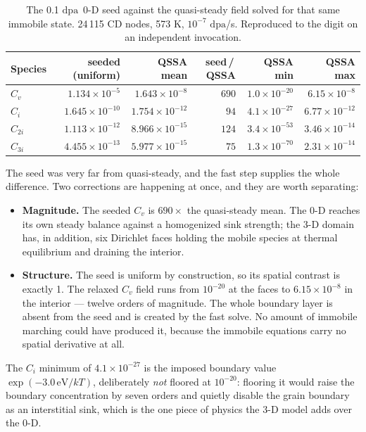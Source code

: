 \documentclass[11pt,a4paper]{article}
\newcommand{\dpa}{\ensuremath{\mathrm{dpa}}}
\begin{document}
\begin{table}[htb]
\centering
\caption{The 0.1 \dpa\ 0-D seed against the quasi-steady field solved for that
         same immobile state. 24\,115 CD nodes, 573 K, $10^{-7}$ \dpa/s.
         Reproduced to the digit on an independent invocation.}
\label{tab:seedrelax}
\begin{tabular}{lrrrrr}
\toprule
Species & seeded (uniform) & QSSA mean & seed\,/\,QSSA & QSSA min & QSSA max \\
\midrule
$C_v$   & $1.134\times10^{-5}$  & $1.643\times10^{-8}$  & $690$ & $1.0\times10^{-20}$ & $6.15\times10^{-8}$ \\
$C_i$   & $1.645\times10^{-10}$ & $1.754\times10^{-12}$ & $94$  & $4.1\times10^{-27}$ & $6.77\times10^{-12}$ \\
$C_{2i}$& $1.113\times10^{-12}$ & $8.966\times10^{-15}$ & $124$ & $3.4\times10^{-53}$ & $3.46\times10^{-14}$ \\
$C_{3i}$& $4.455\times10^{-13}$ & $5.977\times10^{-15}$ & $75$  & $1.3\times10^{-70}$ & $2.31\times10^{-14}$ \\
\bottomrule
\end{tabular}
\end{table}

The seed was very far from quasi-steady, and the fast step supplies the whole
difference. Two corrections are happening at once, and they are worth
separating:

\begin{itemize}
\item \textbf{Magnitude.} The seeded $C_v$ is $690\times$ the quasi-steady mean.
      The 0-D reaches its own steady balance against a homogenized sink
      strength; the 3-D domain has, in addition, six Dirichlet faces holding the
      mobile species at thermal equilibrium and draining the interior.
\item \textbf{Structure.} The seed is uniform by construction, so its spatial
      contrast is exactly 1. The relaxed $C_v$ field runs from $10^{-20}$ at the
      faces to $6.15\times10^{-8}$ in the interior --- twelve orders of
      magnitude. The whole boundary layer is absent from the seed and is created
      by the fast solve. No amount of immobile marching could have produced it,
      because the immobile equations carry no spatial derivative at all.
\end{itemize}

The $C_i$ minimum of $4.1\times10^{-27}$ is the imposed boundary value
$\exp(-3.0\,\mathrm{eV}/kT)$, deliberately \emph{not} floored at $10^{-20}$:
flooring it would raise the boundary concentration by seven orders and quietly
disable the grain boundary as an interstitial sink, which is the one piece of
physics the 3-D model adds over the 0-D.
\end{document}
